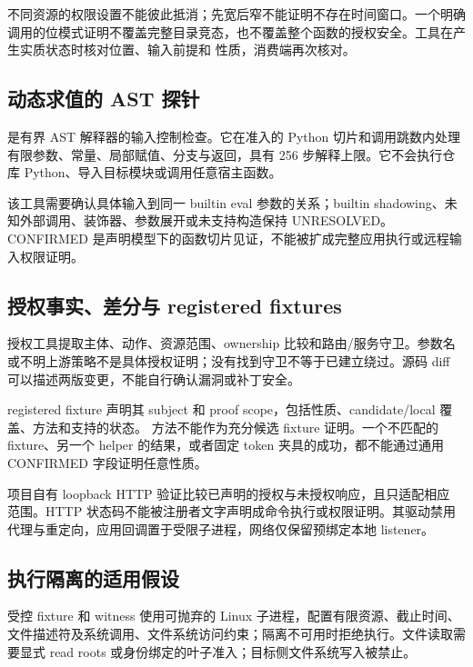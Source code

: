 不同资源的权限设置不能彼此抵消；先宽后窄不能证明不存在时间窗口。一个明确调用的位模式证明不覆盖完整目录竞态，也不覆盖整个函数的授权安全。工具在产生实质状态时核对位置、输入前提和  性质，消费端再次核对。

\subsection{动态求值的 AST 探针}
 是有界 AST 解释器的输入控制检查。它在准入的 Python 切片和调用跳数内处理有限参数、常量、局部赋值、分支与返回，具有 256 步解释上限。它不会执行仓库 Python、导入目标模块或调用任意宿主函数。

该工具需要确认具体输入到同一 builtin eval 参数的关系；builtin shadowing、未知外部调用、装饰器、参数展开或未支持构造保持 UNRESOLVED。CONFIRMED 是声明模型下的函数切片见证，不能被扩成完整应用执行或远程输入权限证明。

\subsection{授权事实、差分与 registered fixtures}
授权工具提取主体、动作、资源范围、ownership 比较和路由/服务守卫。参数名或不明上游策略不是具体授权证明；没有找到守卫不等于已建立绕过。源码 diff 可以描述两版变更，不能自行确认漏洞或补丁安全。

registered fixture 声明其 subject 和 proof scope，包括性质、candidate/local 覆盖、方法和支持的状态。 方法不能作为充分候选 fixture 证明。一个不匹配的 fixture、另一个 helper 的结果，或者固定 token 夹具的成功，都不能通过通用 CONFIRMED 字段证明任意性质。

项目自有 loopback HTTP 验证比较已声明的授权与未授权响应，且只适配相应  范围。HTTP 状态码不能被注册者文字声明成命令执行或权限证明。其驱动禁用代理与重定向，应用回调置于受限子进程，网络仅保留预绑定本地 listener。

\subsection{执行隔离的适用假设}
受控 fixture 和 witness 使用可抛弃的 Linux 子进程，配置有限资源、截止时间、文件描述符及系统调用、文件系统访问约束；隔离不可用时拒绝执行。文件读取需要显式 read roots 或身份绑定的叶子准入；目标侧文件系统写入被禁止。

